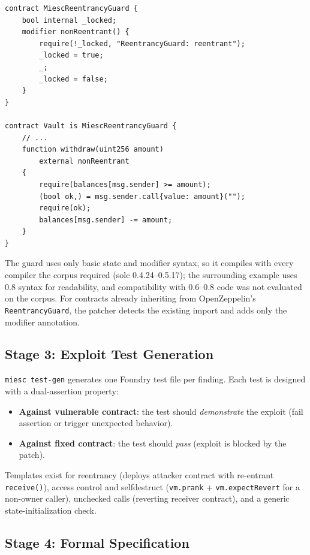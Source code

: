 \documentclass[conference]{IEEEtran}
\begin{document}
\begin{lstlisting}[caption={Patched: inline reentrancy guard injected by MIESC},label={lst:after},float=htbp]
contract MiescReentrancyGuard {
    bool internal _locked;
    modifier nonReentrant() {
        require(!_locked, "ReentrancyGuard: reentrant");
        _locked = true;
        _;
        _locked = false;
    }
}

contract Vault is MiescReentrancyGuard {
    // ...
    function withdraw(uint256 amount)
        external nonReentrant
    {
        require(balances[msg.sender] >= amount);
        (bool ok,) = msg.sender.call{value: amount}("");
        require(ok);
        balances[msg.sender] -= amount;
    }
}
\end{lstlisting}

The guard uses only basic state and modifier syntax, so it compiles with every compiler the corpus required (solc 0.4.24--0.5.17); the surrounding example uses 0.8 syntax for readability, and compatibility with 0.6--0.8 code was not evaluated on the corpus. For contracts already inheriting from OpenZeppelin's \texttt{ReentrancyGuard}, the patcher detects the existing import and adds only the modifier annotation.

\subsection{Stage 3: Exploit Test Generation}

\texttt{miesc test-gen} generates one Foundry test file per finding. Each test is designed with a dual-assertion property:

\begin{itemize}
    \item \textbf{Against vulnerable contract}: the test should \emph{demonstrate} the exploit (fail assertion or trigger unexpected behavior).
    \item \textbf{Against fixed contract}: the test should \emph{pass} (exploit is blocked by the patch).
\end{itemize}

Templates exist for reentrancy (deploys attacker contract with re-entrant \texttt{receive()}), access control and selfdestruct (\texttt{vm.prank} + \texttt{vm.expectRevert} for a non-owner caller), unchecked calls (reverting receiver contract), and a generic state-initialization check.

\subsection{Stage 4: Formal Specification}
\end{document}
